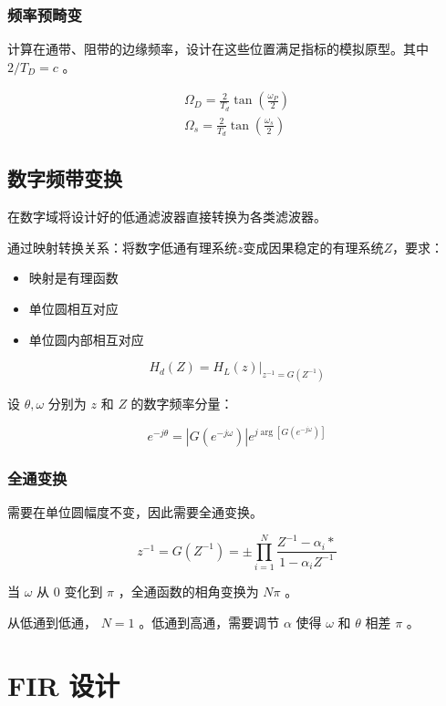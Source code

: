 \documentclass[cn,11pt,chinese,black,simple]{elegantbook}
\begin{document}
\subsubsection{频率预畸变}

计算在通带、阻带的边缘频率，设计在这些位置满足指标的模拟原型。其中 \( 2 / T_D = c\) 。

\[
    \begin{array}{l}
        \Omega_{D}=\frac{2}{T_{d}} \tan \left(\frac{\omega_{P}}{2}\right) \\
        \Omega_{s}=\frac{2}{T_{d}} \tan \left(\frac{\omega_{s}}{2}\right)
        \end{array}\]

\subsection{数字频带变换}

在数字域将设计好的低通滤波器直接转换为各类滤波器。


通过映射转换关系：将数字低通有理系统\(z\)变成因果稳定的有理系统\(Z\)，要求：

\begin{itemize}
    \item 映射是有理函数
    \item 单位圆相互对应
    \item 单位圆内部相互对应
\end{itemize}

\[H_{d}(Z)=\left.H_{L}(z)\right|_{z^{-1}=G\left(Z^{-1}\right)}\]

设 \(\theta, \omega\) 分别为 \(z\) 和 \(Z\) 的数字频率分量：

\[
e^{-j \theta}=\left|G\left(e^{-j \omega}\right)\right| e^{j \arg \left[G\left(e^{-j \omega}\right)\right]}
\]

\subsubsection{全通变换}

需要在单位圆幅度不变，因此需要全通变换。

\[
z^{-1}=G\left(Z^{-1}\right)=\pm \prod_{i=1}^{N} \frac{Z^{-1}-\alpha_{i} *}{1-\alpha_{i} Z^{-1}}
\]

当 \(\omega\) 从 \(0\) 变化到 \(\pi\) ，全通函数的相角变换为 \(N\pi\) 。

从低通到低通， \(N = 1\) 。低通到高通，需要调节 \(\alpha\) 使得 \(\omega\) 和 \(\theta\) 相差 \(\pi\) 。

\section{FIR 设计}
\end{document}
